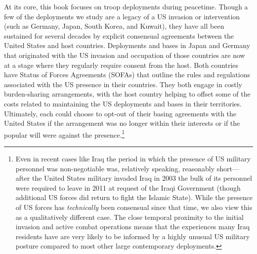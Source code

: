 At its core, this book focuses on troop deployments during peacetime. Though a few of the deployments we study are a legacy of a US invasion or intervention (such as Germany, Japan, South Korea, and Kuwait), they have all been sustained for several decades by explicit consensual agreements between the United States and host countries. Deployments and bases in Japan and Germany that originated with the US invasion and occupation of those countries are now at a stage where they regularly require consent from the host. Both countries have Status of Forces Agreements (SOFAs) that outline the rules and regulations associated with the US presence in their countries. They both engage in costly burden-sharing arrangements, with the host country helping to offset some of the costs related to maintaining the US deployments and bases in their territories. Ultimately, each could choose to opt-out of their basing agreements with the United States if the arrangement was no longer within their interests or if the popular will were against the presence.\footnote{Even in recent cases like Iraq the period in which the presence of US military personnel was non-negotiable was, relatively speaking, reasonably short---after the United States military invaded Iraq in 2003 the bulk of its personnel were required to leave in 2011 at request of the Iraqi Government (though additional US forces did return to fight the Islamic State). While the presence of US forces has \textit{technically} been consensual since that time, we also view this as a qualitatively different case. The close temporal proximity to the initial invasion and active combat operations means that the experiences many Iraq residents have are very likely to be informed by a highly unusual US military posture compared to most other large contemporary deployments.}





